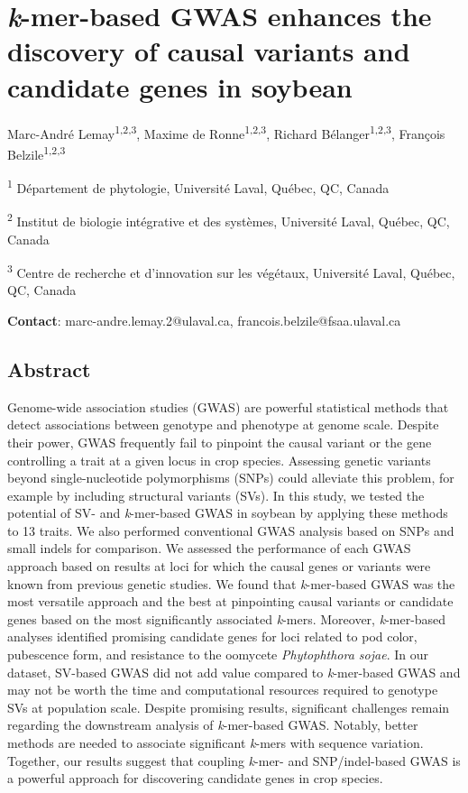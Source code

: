 \chapter*{\textit{k}-mer-based GWAS enhances the discovery of causal variants and candidate genes in soybean}
\label{kmer-gwas}

Marc-André Lemay\textsuperscript{1,2,3},
Maxime de Ronne\textsuperscript{1,2,3},
Richard Bélanger\textsuperscript{1,2,3},
François Belzile\textsuperscript{1,2,3}

\textsuperscript{1} Département de phytologie, Université Laval, Québec, QC, Canada

\textsuperscript{2} Institut de biologie intégrative et des systèmes, Université Laval, Québec, QC, Canada

\textsuperscript{3} Centre de recherche et d’innovation sur les végétaux, Université Laval, Québec, QC, Canada

\textbf{Contact}: marc-andre.lemay.2@ulaval.ca, francois.belzile@fsaa.ulaval.ca

\clearpage

\section*{Abstract}

Genome-wide association studies (GWAS) are powerful statistical methods that
detect associations between genotype and phenotype at genome scale. Despite
their power, GWAS frequently fail to pinpoint the causal variant or the gene
controlling a trait at a given locus in crop species. Assessing genetic
variants beyond single-nucleotide polymorphisms (SNPs) could alleviate this
problem, for example by including structural variants (SVs).  In this study, we
tested the potential of SV- and \emph{k}-mer-based GWAS in soybean by applying
these methods to 13 traits.  We also performed conventional GWAS analysis based
on SNPs and small indels for comparison.  We assessed the performance of each
GWAS approach based on results at loci for which the causal genes or variants
were known from previous genetic studies. We found that \emph{k}-mer-based GWAS
was the most versatile approach and the best at pinpointing causal variants or
candidate genes based on the most significantly associated \emph{k}-mers.
Moreover, \textit{k}-mer-based analyses identified promising candidate genes
for loci related to pod color, pubescence form, and resistance to the oomycete
\textit{Phytophthora sojae}. In our dataset, SV-based GWAS did not add value
compared to \textit{k}-mer-based GWAS and may not be worth the time and
computational resources required to genotype SVs at population scale.  Despite
promising results, significant challenges remain regarding the downstream
analysis of \emph{k}-mer-based GWAS.  Notably, better methods are needed to
associate significant \emph{k}-mers with sequence variation. Together, our
results suggest that coupling \emph{k}-mer- and SNP/indel-based GWAS is a
powerful approach for discovering candidate genes in crop species.

